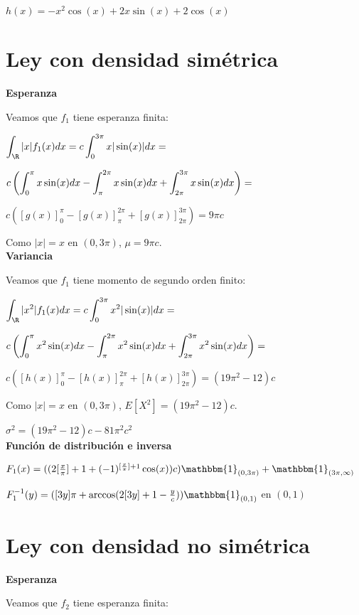 \documentclass[a5paper]{article}
\newcommand{\ind}[1]{\mathbbm{1}_{#1}}
\begin{document}
$ h(x) = -x^2\cos(x) + 2x\sin(x) + 2\cos(x) $


\section{ Ley con densidad simétrica }

{\bf Esperanza }

Veamos que $f_1$ tiene esperanza finita:

$\integral{ |x|f_1(x) }{ dx }{ \R } = c \integral{ x |\sin(x)| }{ dx }{ 0 }[ 3\pi ] = $

$c\left ( \integral{ x \sin(x) }{ dx }{ 0 }[ \pi ] - \integral{ x\sin(x) }{ dx }{ \pi }[ 2\pi ] + \integral{ x \sin(x) }{ dx }{ 2\pi }[ 3\pi ]\right ) = $

$ c\left ( [g(x)]_0^\pi - [g(x)]_\pi^{2\pi} + [g(x)]_{2\pi}^{3\pi} \right ) = 9\pi c$

Como $|x| = x$ en $(0,3\pi)$, $\mu = 9\pi c$.\\

{\bf Variancia }

Veamos que $f_1$ tiene momento de segundo orden finito:

$\integral{ |x^2|f_1(x) }{ dx }{ \R } = c \integral{ x^2 |\sin(x)| }{ dx }{ 0 }[ 3\pi ] = $

$c\left ( \integral{ x^2 \sin(x) }{ dx }{ 0 }[ \pi ] - \integral{ x^2\sin(x) }{ dx }{ \pi }[ 2\pi ] + \integral{ x^2 \sin(x) }{ dx }{ 2\pi }[ 3\pi ]\right ) = $

$ c\left ( [h(x)]_0^\pi - [h(x)]_\pi^{2\pi} + [h(x)]_{2\pi}^{3\pi} \right ) = (19\pi^2 -12)c $

Como $|x| = x$ en $(0,3\pi)$, $E[X^2] = (19\pi^2 -12)c$.

$\sigma^2 = (19\pi^2 -12)c - 81\pi^2c^2$\\

{\bf Función de distribución e inversa}

$F_1(x) = ((2[\frac{ x }{ \pi }]+1 + (-1)^{[\frac{ x }{ \pi }]+1}\cos(x))c)\ind{(0,3\pi)} + \ind{(3\pi,\infty)}$

$F_1^{-1}(y) = ([3y]\pi + \arccos(2[3y]+1 - \frac{ y }{ c }))\ind{(0,1)}$ en $(0,1)$


\section{ Ley con densidad no simétrica }

{\bf Esperanza }

Veamos que $f_2$ tiene esperanza finita:
\end{document}

